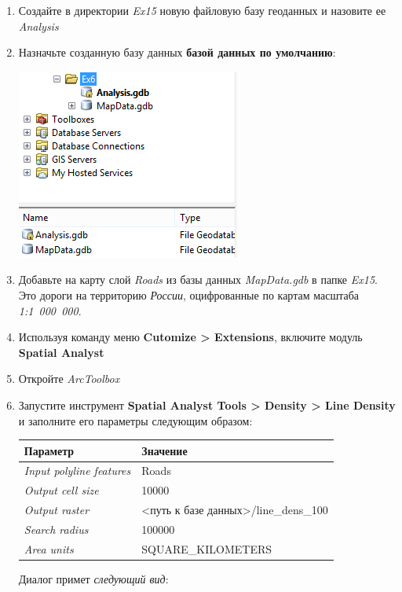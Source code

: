 \documentclass[]{book}
\theoremstyle{definition}
\theoremstyle{definition}
\theoremstyle{definition}
\theoremstyle{remark}
\begin{document}
\begin{enumerate}
\def\labelenumi{\arabic{enumi}.}
\item
  Создайте в директории \emph{Ex15} новую файловую базу геоданных и
  назовите ее \emph{Analysis}
\item
  Назначьте созданную базу данных \textbf{базой данных по умолчанию}:

  \includegraphics{images/Ex15/image5.png}
\item
  Добавьте на карту слой \emph{Roads} из базы данных \emph{MapData.gdb}
  в папке \emph{Ex15}. Это дороги на территорию \emph{России},
  оцифрованные по картам масштаба \emph{1:1~000~000}.
\item
  Используя команду меню \textbf{Cutomize \textgreater{} Extensions},
  включите модуль \textbf{Spatial Analyst}
\item
  Откройте \emph{ArcToolbox}
\item
  Запустите инструмент \textbf{Spatial Analyst Tools \textgreater{}
  Density \textgreater{} Line Density} и заполните его параметры
  следующим образом:

  \begin{longtable}[]{@{}ll@{}}
  \toprule
  Параметр & Значение\tabularnewline
  \midrule
  \endhead
  \emph{Input polyline features} & Roads\tabularnewline
  \emph{Output cell size} & 10000\tabularnewline
  \emph{Output raster} & \textless{}путь к базе
  данных\textgreater{}/line\_dens\_100\tabularnewline
  \emph{Search radius} & 100000\tabularnewline
  \emph{Area units} & SQUARE\_KILOMETERS\tabularnewline
  \bottomrule
  \end{longtable}

  Диалог примет \emph{следующий вид}:


\end{enumerate}
\end{document}

